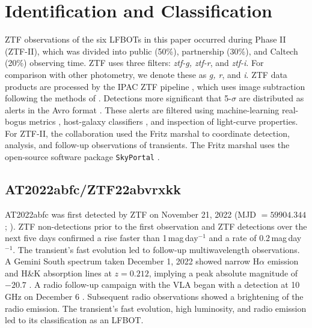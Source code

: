 \documentclass[twocolumn,twocolappendix, linenumbers, trackchanges]{aastex7}
\begin{document}

\appendix

\section{Identification {\bf and Classification}}\label{sec:discovery}

  ZTF observations of the six LFBOTs in this paper occurred during Phase II (ZTF-II), which was divided into public (50\%), partnership (30\%), and Caltech (20\%) observing time.  ZTF uses three filters: {\em ztf-g, ztf-r}, and {\em ztf-i}.  For comparison with other photometry, we denote these as {\em g, r}, and {\em i}.
ZTF data products are processed by the IPAC ZTF pipeline \citep{masci2019}, which uses image subtraction following the methods of \citet{zackay2016}.  Detections more significant that 5-$\sigma$ are distributed as alerts in the Avro format \citep{patterson2019}.  These alerts are filtered using machine-learning real-bogus metrics \citep{mahabal2019, duev2019}, host-galaxy classifiers \citep{tachibana2018}, and inspection of light-curve properties.  For ZTF-II, the collaboration used the Fritz marshal \citep{vanderwalt2019, duev2019} to coordinate detection, analysis, and follow-up observations of transients.  The Fritz marshal uses the open-source software package \texttt{SkyPortal} \citep{coughlin2023}.

\subsection{AT2022abfc/ZTF22abvrxkk}
AT2022abfc was first detected by ZTF on November 21, 2022 (MJD $=59904.344$; \citealt{astro2022abfc_disc}).  ZTF non-detections prior to the first observation and ZTF detections over the next five days confirmed a rise faster than 1\,mag\,day$^{-1}$ and a  rate of 0.2\,mag\,day$^{-1}$.  The transient's fast evolution led to follow-up multiwavelength observations.  A Gemini South spectrum taken December 1, 2022 showed narrow H$\alpha$ emission and  H\&K absorption lines at $z=0.212$, implying a peak absolute magnitude of $-20.7$ \citep{astro2022abfc_vla}.  A radio follow-up campaign with the VLA %
began with a detection at 10 GHz on December 6 \citep{astro2022abfc_vla}.  Subsequent radio observations showed a brightening of the radio emission.  The transient's fast evolution, high luminosity, and radio emission led to its classification as an LFBOT.
\end{document}
